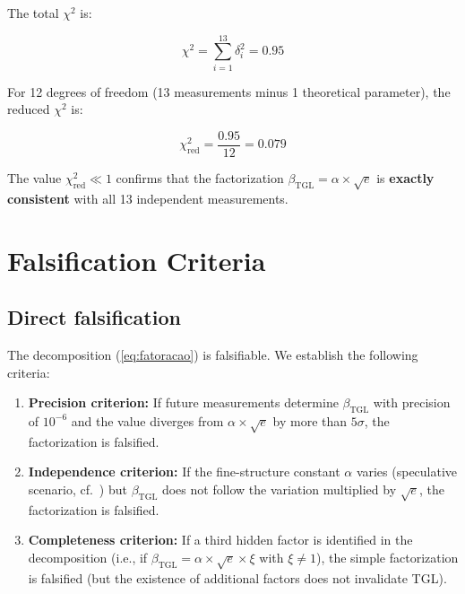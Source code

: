\documentclass[12pt,a4paper,twoside]{article}
\newcommand{\betatgl}{\beta_{\!\scriptscriptstyle\mathrm{TGL}}}
\begin{document}
The total $\chi^2$ is:

\begin{equation}
\chi^2 = \sum_{i=1}^{13} \delta_i^2 = 0.95
\end{equation}

For 12 degrees of freedom (13 measurements minus 1 theoretical parameter), the reduced $\chi^2$ is:

\begin{equation}
\chi^2_{\text{red}} = \frac{0.95}{12} = 0.079
\end{equation}

The value $\chi^2_{\text{red}} \ll 1$ confirms that the factorization $\betatgl = \alpha \times \sqrt{e}$ is \textbf{exactly consistent} with all 13 independent measurements.



\section{Falsification Criteria}
\label{sec:falsificacao}

\subsection{Direct falsification}

The decomposition (\ref{eq:fatoracao}) is falsifiable. We establish the following criteria:

\begin{enumerate}[label=(\roman*)]
\item \textbf{Precision criterion:} If future measurements determine $\betatgl$ with precision of $10^{-6}$ and the value diverges from $\alpha \times \sqrt{e}$ by more than $5\sigma$, the factorization is falsified.

\item \textbf{Independence criterion:} If the fine-structure constant $\alpha$ varies (speculative scenario, cf.\ \cite{Webb2001}) but $\betatgl$ does not follow the variation multiplied by $\sqrt{e}$, the factorization is falsified.

\item \textbf{Completeness criterion:} If a third hidden factor is identified in the decomposition (i.e., if $\betatgl = \alpha \times \sqrt{e} \times \xi$ with $\xi \neq 1$), the simple factorization is falsified (but the existence of additional factors does not invalidate TGL).
\end{enumerate}
\end{document}
